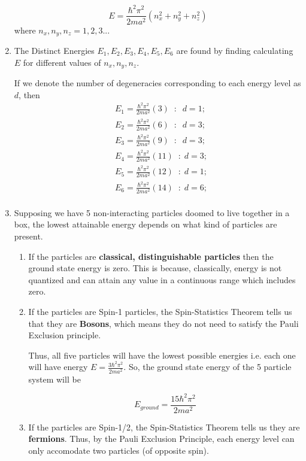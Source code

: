 \documentclass[twoside]{article}
\begin{document}
\begin{enumerate}[label=\alph*]
   \[ \boxed{ E = \frac{\hbar^2 \pi^2}{2ma^2} (n_x^2 + n_y^2 + n_z^2) } \]  
   where $n_x, n_y, n_z = 1,2,3...$ 

   \item The Distinct Energies $E_1, E_2, E_3, E_4, E_5, E_6$ are found by finding calculating $E$ for different values of $n_x, n_y, n_z$.
   
   If we denote the number of degeneracies corresponding to each energy level as $d$, then
   \begin{align*}
      &E_1 = \frac{\hbar^2 \pi^2}{2ma^2} (3) \;\;:\;\; d = 1; \\
      &E_2 = \frac{\hbar^2 \pi^2}{2ma^2} (6) \;\;:\;\; d = 3; \\
      &E_3 = \frac{\hbar^2 \pi^2}{2ma^2} (9) \;\;:\;\; d = 3; \\
      &E_4 = \frac{\hbar^2 \pi^2}{2ma^2} (11) \;\;:\; d = 3; \\
      &E_5 = \frac{\hbar^2 \pi^2}{2ma^2} (12) \;\;:\; d = 1; \\
      &E_6 = \frac{\hbar^2 \pi^2}{2ma^2} (14) \;\;:\; d = 6; \\
   \end{align*}


   \item Supposing we have 5 non-interacting particles doomed to live together in a box, the lowest attainable energy depends on what kind of particles are present.
   
   \begin{enumerate}
      \item If the particles are \textbf{classical, distinguishable particles} then the ground state energy is zero. This is because, classically, energy is not quantized and can attain any value in a continuous range which includes zero.
      \vskip 1cm
      
      \item If the particles are Spin-1 particles, the Spin-Statistics Theorem tells us that they are \textbf{Bosons}, which means they do not need to satisfy the Pauli Exclusion principle. 
      
      Thus, all five particles will have the lowest possible energies i.e. each one will have energy $E = \frac{3\hbar^2\pi^2}{2ma^2}$. So, the ground state energy of the 5 particle system will be 

      \[ \boxed{E_{ground} = \frac{15\hbar^2\pi^2}{2ma^2}} \]
      \vskip 1cm

      \item If the particles are Spin-1/2, the Spin-Statistics Theorem tells us they are \textbf{fermions}. Thus, by the Pauli Exclusion Principle, each energy level can only accomodate two particles (of opposite spin).
      

\end{enumerate}
\end{enumerate}
\end{document}
